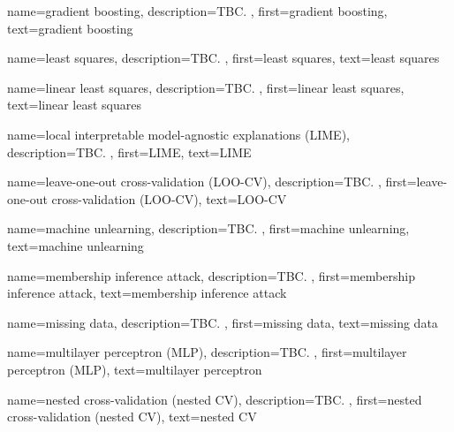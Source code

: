{name={gradient boosting},
 	description={TBC. },
 	first={gradient boosting}, 
 	text={gradient boosting}
}


{name={least squares},
	description={TBC. },
	first={least squares},
	text={least squares}
}

{name={linear least squares},
	description={TBC. },
	first={linear least squares},
	text={linear least squares}
}

{name={local interpretable model-agnostic explanations (LIME)},
	description={TBC. },
	first={LIME},
	text={LIME}
}

{name={leave-one-out cross-validation (LOO-CV)},
	description={TBC. },
	first={leave-one-out cross-validation (LOO-CV)},
	text={LOO-CV}
}

{name={machine unlearning},
	description={TBC. },
	first={machine unlearning},
	text={machine unlearning}
}

{name={membership inference attack}, 
	description={TBC. }, 
 	first={membership inference attack}, 
 	text={membership inference attack}
}

{name={missing data},
	description={TBC. },
	first={missing data},
	text={missing data}  
}

{name={multilayer perceptron (MLP)},
	description={TBC. },
	first={multilayer perceptron (MLP)},
	text={multilayer perceptron}
}

{name={nested cross-validation (nested CV)},
	description={TBC. },
	first={nested cross-validation (nested CV)},
	text={nested CV}
}

